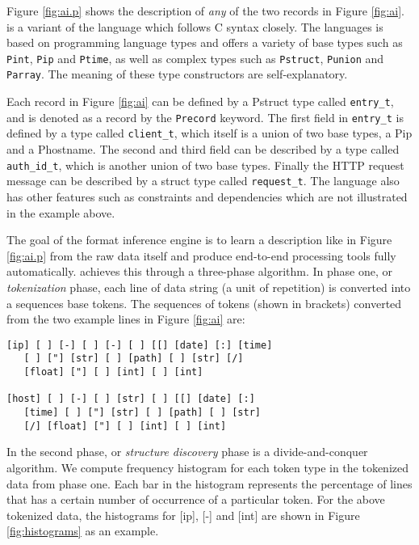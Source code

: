 Figure \ref{fig:ai.p} shows the \padsc {} description of {\em any}
of the two records in Figure \ref{fig:ai}. \padsc{} is a variant of the
\pads{} language which follows C syntax closely. 
The \pads{} languages is based on programming language types and
offers a variety of base types such as {\tt Pint}, {\tt Pip} and {\tt Ptime}, 
as well as complex types such as {\tt Pstruct}, {\tt Punion} and {\tt Parray}. 
The meaning of these type constructors are self-explanatory.

Each record in Figure \ref{fig:ai} can be defined by a Pstruct type called \verb#entry_t#, 
and is denoted as a record by the {\tt Precord} keyword. 
The first field in \verb#entry_t# is defined by a type called 
\verb#client_t#, which itself is a union of two base types, a Pip and
a Phostname. The second and third field can be described by a type
called \verb#auth_id_t#, which is another union of two base types.
Finally the HTTP request message can be described by a struct type
called \verb#request_t#. The \pads{} language also has other features
such as constraints and dependencies which are not illustrated in the example
above. 

The goal of the \learnpads{} format inference engine is to 
learn a \pads{} description like in Figure \ref{fig:ai.p} from
the raw data itself and produce end-to-end processing tools fully
automatically. \learnpads{} achieves this through a three-phase algorithm.
In phase one, or {\em tokenization} phase, each line of data string (a unit of
repetition) is converted into a sequences base tokens. The sequences of
tokens (shown in brackets) converted from the two example lines 
in Figure \ref{fig:ai} are:

{\small
\begin{verbatim}
[ip] [ ] [-] [ ] [-] [ ] [[] [date] [:] [time] 
   [ ] ["] [str] [ ] [path] [ ] [str] [/] 
   [float] ["] [ ] [int] [ ] [int]

[host] [ ] [-] [ ] [str] [ ] [[] [date] [:] 
   [time] [ ] ["] [str] [ ] [path] [ ] [str] 
   [/] [float] ["] [ ] [int] [ ] [int]
\end{verbatim}
}

In the second phase, or {\em structure discovery} phase is
a divide-and-conquer algorithm. 
We compute frequency histogram for each token type in the
tokenized data from phase one. Each bar in the histogram represents
the percentage of lines that has a certain number of occurrence of
a particular token. For the above tokenized data, the histograms for 
[ip], [-] and [int] are shown in Figure \ref{fig:histograms} as an example.

